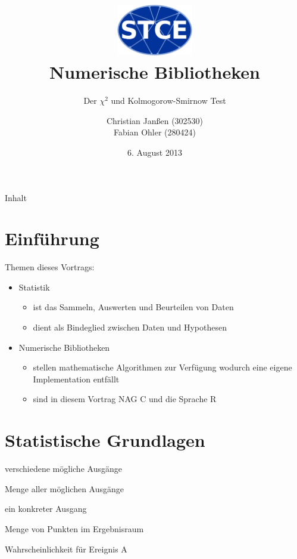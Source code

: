 \documentclass{beamer}
\begin{document}
\title{\centering
\includegraphics[width=0.25\textwidth]{./figures/logo.eps} \\ Numerische Bibliotheken}

\subtitle{Der $\chi^2$ und Kolmogorow-Smirnow Test}
\author{Christian Janßen (302530) \\ Fabian Ohler (280424) }
\date{6. August 2013}
\frame[plain]{\titlepage}

\begin{frame}{Inhalt}
	\tableofcontents
\end{frame}

\section{Einführung}
\begin{frame}{\insertsection}
Themen dieses Vortrags:
	\begin{itemize}
		\item Statistik
			\begin{itemize}
			\item ist das Sammeln, Auswerten und Beurteilen von Daten
			\item dient als Bindeglied zwischen Daten und Hypothesen
			\end{itemize}		
		\item Numerische Bibliotheken
			\begin{itemize}
			\item stellen mathematische Algorithmen zur Verfügung wodurch eine eigene Implementation entfällt
			\item sind in diesem Vortrag NAG C und die Sprache R
			\end{itemize}
	\end{itemize}
\end{frame}

\section{Statistische Grundlagen}

\begin{frame}{\insertsection}
	\begin{description}
	\item[Experiment] verschiedene mögliche Ausgänge
	\item[Ergebnisraum] Menge aller möglichen Ausgänge
	\item[Punkt im Ergebnisraum] ein konkreter Ausgang
	\item[Ereignis] Menge von Punkten im Ergebnisraum
	\item[P(A)] Wahrscheinlichkeit für Ereignis A
	\end{description}
\end{frame}
\end{document}
